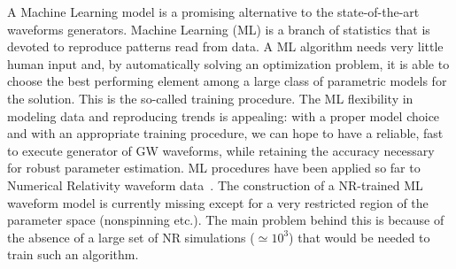 A Machine Learning model is a promising alternative to the
state-of-the-art waveforms generators.
%
%
Machine Learning (ML) is a branch of statistics that is devoted to reproduce patterns read from data. 
A ML algorithm needs very little human input and, by automatically solving an optimization problem, 
it is able to choose the best performing element among a large  class of parametric models for the solution. 
This is the so-called training procedure. 
The ML flexibility in modeling data and reproducing trends is appealing: with a proper model choice 
and with an appropriate training procedure, we can hope to have a reliable, fast to execute generator 
of GW waveforms, while retaining the accuracy necessary for robust parameter estimation. 
ML procedures have been applied so far to Numerical Relativity 
waveform
data~\cite{Gabbard:2017lja,George:2017pmj,George:2017vlv,Rebei:2018lzh,Khan:2020foe}.
%
%
The construction of a NR-trained ML waveform model is currently missing except for a very 
restricted region of the parameter space (nonspinning etc.). The main problem behind this is 
because of the absence of a large set of NR simulations ($\simeq 10^{3}$) that would be 
needed to train such an algorithm.

